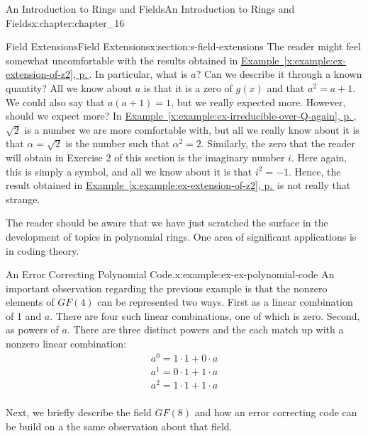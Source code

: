 \documentclass[twoside,10pt,]{book}
\newcommand{\xreffont}{\relax}
\numberwithin{equation}{section}
\begin{document}
\begin{chapterptx}{An Introduction to Rings and Fields}{}{An Introduction to Rings and Fields}{}{}{x:chapter:chapter_16}
\begin{sectionptx}{Field Extensions}{}{Field Extensions}{}{}{x:section:s-field-extensions}
The reader might feel somewhat uncomfortable with the results obtained in \hyperref[x:example:ex-extension-of-z2]{Example~{\xreffont\ref{x:example:ex-extension-of-z2}}, p.\,\pageref{x:example:ex-extension-of-z2}}. In particular, what is \(a\)? Can we describe it through a known quantity? All we know about \(a\) is that it is a zero of \(g(x)\) and that \(a^2= a + 1\). We could also say that \(a(a + 1) = 1\), but we really expected more. However, should we expect more? In \hyperref[x:example:ex-irreducible-over-Q-again]{Example~{\xreffont\ref{x:example:ex-irreducible-over-Q-again}}, p.\,\pageref{x:example:ex-irreducible-over-Q-again}}, \(\sqrt{2}\) is a number we are more comfortable with, but all we really know about it is that \(\alpha =\sqrt{2}\) is the number such that \(\alpha ^2= 2\). Similarly, the zero that the reader will obtain in Exercise 2 of this section is the imaginary number \(i\). Here again, this is simply a symbol, and all we know about it is that \(i^2=-1\). Hence, the result obtained in \hyperref[x:example:ex-extension-of-z2]{Example~{\xreffont\ref{x:example:ex-extension-of-z2}}, p.\,\pageref{x:example:ex-extension-of-z2}} is not really that strange.%
\par
The reader should be aware that we have just scratched the surface in the development of topics in polynomial rings. One area of significant applications is in coding theory.%
\begin{example}{An Error Correcting Polynomial Code.}{x:example:ex-ex-polynomial-code}%
%
%
An important observation regarding the previous example is that the nonzero elements of \(GF(4)\) can be represented two ways.  First as a linear combination of 1 and \(a\).   There are four such linear combinations, one of which is zero.  Second, as powers of \(a\).  There are three distinct powers and the each match up with a nonzero linear combination:%
\begin{equation*}
\begin{array}{c}
a^0 = 1\cdot 1 + 0 \cdot a\\
a^1 = 0\cdot 1 + 1 \cdot a\\
a^2 = 1\cdot 1 + 1 \cdot a\\
\end{array}
\end{equation*}
%
\par
Next, we briefly describe the field \(GF(8)\) and how an error correcting code can be build on a the same observation about that field.%
\par

\end{example}
\end{sectionptx}
\end{chapterptx}
\end{document}

